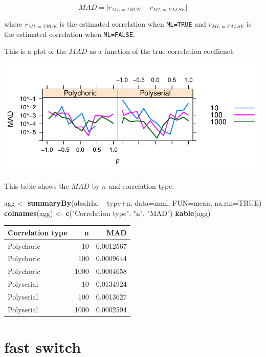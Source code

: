 \documentclass[]{article}
\newenvironment{Shaded}{\begin{snugshade}}{\end{snugshade}}
\newcommand{\KeywordTok}[1]{\textcolor[rgb]{0.13,0.29,0.53}{\textbf{{#1}}}}
\newcommand{\DataTypeTok}[1]{\textcolor[rgb]{0.13,0.29,0.53}{{#1}}}
\newcommand{\StringTok}[1]{\textcolor[rgb]{0.31,0.60,0.02}{{#1}}}
\newcommand{\OtherTok}[1]{\textcolor[rgb]{0.56,0.35,0.01}{{#1}}}
\newcommand{\NormalTok}[1]{{#1}}
\begin{document}
\[MAD= | r_{ML=TRUE} - r_{ML=FALSE} |  \]

where \(r_{ML=TRUE}\) is the estimated correlation when \texttt{ML=TRUE}
and \(r_{ML=FALSE}\) is the estimated correlation when
\texttt{ML=FALSE}.

This is a plot of the \(MAD\) as a function of the true correlation
coefficnet.

\includegraphics{wCorrArguments_files/figure-latex/unnamed-chunk-1-1.pdf}

This table shows the \(MAD\) by \(n\) and correlation type.

\begin{Shaded}
\begin{Highlighting}[]
\NormalTok{agg <-}\StringTok{ }\KeywordTok{summaryBy}\NormalTok{(absdrho ~}\StringTok{ }\NormalTok{type+n, }\DataTypeTok{data=}\NormalTok{mml, }\DataTypeTok{FUN=}\NormalTok{mean, }\DataTypeTok{na.rm=}\OtherTok{TRUE}\NormalTok{)}
\KeywordTok{colnames}\NormalTok{(agg) <-}\StringTok{ }\KeywordTok{c}\NormalTok{(}\StringTok{"Correlation type"}\NormalTok{, }\StringTok{"n"}\NormalTok{, }\StringTok{"MAD"}\NormalTok{)}
\KeywordTok{kable}\NormalTok{(agg)}
\end{Highlighting}
\end{Shaded}

\begin{longtable}[c]{@{}lrr@{}}
\toprule
Correlation type & n & MAD\tabularnewline
\midrule
\endhead
Polychoric & 10 & 0.0012567\tabularnewline
Polychoric & 100 & 0.0009644\tabularnewline
Polychoric & 1000 & 0.0004658\tabularnewline
Polyserial & 10 & 0.0134924\tabularnewline
Polyserial & 100 & 0.0013627\tabularnewline
Polyserial & 1000 & 0.0002594\tabularnewline
\bottomrule
\end{longtable}

\section{fast switch}\label{fast-switch}
\end{document}
